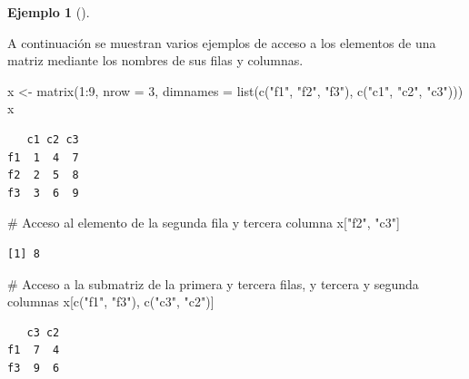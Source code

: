 \documentclass[
  a4paper,
]{scrreport}
\newenvironment{Shaded}{\begin{snugshade}}{\end{snugshade}}
\newcommand{\AttributeTok}[1]{\textcolor[rgb]{0.40,0.45,0.13}{#1}}
\newcommand{\CommentTok}[1]{\textcolor[rgb]{0.37,0.37,0.37}{#1}}
\newcommand{\DecValTok}[1]{\textcolor[rgb]{0.68,0.00,0.00}{#1}}
\newcommand{\FunctionTok}[1]{\textcolor[rgb]{0.28,0.35,0.67}{#1}}
\newcommand{\NormalTok}[1]{\textcolor[rgb]{0.00,0.23,0.31}{#1}}
\newcommand{\OtherTok}[1]{\textcolor[rgb]{0.00,0.23,0.31}{#1}}
\newcommand{\SpecialCharTok}[1]{\textcolor[rgb]{0.37,0.37,0.37}{#1}}
\newcommand{\StringTok}[1]{\textcolor[rgb]{0.13,0.47,0.30}{#1}}
\theoremstyle{definition}
\newtheorem{example}{Ejemplo}[chapter]
\theoremstyle{definition}
\theoremstyle{remark}
\begin{document}
\leavevmode{}%
\begin{example}[]\label{exm-acceso-matriz-nombres}

A continuación se muestran varios ejemplos de acceso a los elementos de
una matriz mediante los nombres de sus filas y columnas.

\begin{Shaded}
\begin{Highlighting}[]
\NormalTok{x }\OtherTok{\textless{}{-}} \FunctionTok{matrix}\NormalTok{(}\DecValTok{1}\SpecialCharTok{:}\DecValTok{9}\NormalTok{, }\AttributeTok{nrow =} \DecValTok{3}\NormalTok{, }\AttributeTok{dimnames =} \FunctionTok{list}\NormalTok{(}\FunctionTok{c}\NormalTok{(}\StringTok{"f1"}\NormalTok{, }\StringTok{"f2"}\NormalTok{, }\StringTok{"f3"}\NormalTok{), }\FunctionTok{c}\NormalTok{(}\StringTok{"c1"}\NormalTok{, }\StringTok{"c2"}\NormalTok{, }\StringTok{"c3"}\NormalTok{)))}
\NormalTok{x}
\end{Highlighting}
\end{Shaded}

\begin{verbatim}
   c1 c2 c3
f1  1  4  7
f2  2  5  8
f3  3  6  9
\end{verbatim}

\begin{Shaded}
\begin{Highlighting}[]
\CommentTok{\# Acceso al elemento de la segunda fila y tercera columna}
\NormalTok{x[}\StringTok{"f2"}\NormalTok{, }\StringTok{"c3"}\NormalTok{]}
\end{Highlighting}
\end{Shaded}

\begin{verbatim}
[1] 8
\end{verbatim}

\begin{Shaded}
\begin{Highlighting}[]
\CommentTok{\# Acceso a la submatriz de la primera y tercera filas, y tercera y segunda columnas}
\NormalTok{x[}\FunctionTok{c}\NormalTok{(}\StringTok{"f1"}\NormalTok{, }\StringTok{"f3"}\NormalTok{), }\FunctionTok{c}\NormalTok{(}\StringTok{"c3"}\NormalTok{, }\StringTok{"c2"}\NormalTok{)]}
\end{Highlighting}
\end{Shaded}

\begin{verbatim}
   c3 c2
f1  7  4
f3  9  6
\end{verbatim}

\end{example}
\end{document}
